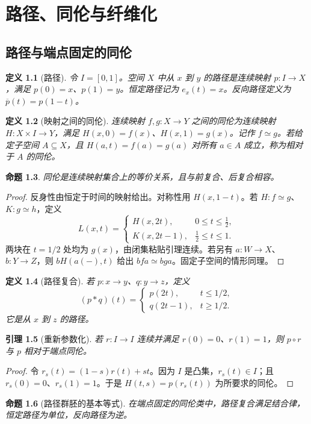 \documentclass[12pt,oneside,openany,fontset=none]{ctexbook}
\theoremstyle{cn}
\newtheorem{definition}{定义}[chapter]
\newtheorem{lemma}[definition]{引理}
\newtheorem{proposition}[definition]{命题}
\numberwithin{equation}{chapter}
\begin{document}
\chapter{路径、同伦与纤维化}
\section{路径与端点固定的同伦}
\begin{definition}[路径]
令 $I=[0,1]$。空间 $X$ 中从 $x$ 到 $y$ 的路径是连续映射 $p:I\to X$，满足 $p(0)=x$、$p(1)=y$。恒定路径记为 $e_x(t)=x$。反向路径定义为 $\overline p(t)=p(1-t)$。
\end{definition}
\begin{definition}[映射之间的同伦]
连续映射 $f,g:X\to Y$ 之间的同伦为连续映射 $H:X\times I\to Y$，满足 $H(x,0)=f(x)$、$H(x,1)=g(x)$。记作 $f\simeq g$。若给定子空间 $A\subseteq X$，且 $H(a,t)=f(a)=g(a)$ 对所有 $a\in A$ 成立，称为相对于 $A$ 的同伦。
\end{definition}
\begin{proposition}
同伦是连续映射集合上的等价关系，且与前复合、后复合相容。
\end{proposition}
\begin{proof}
反身性由恒定于时间的映射给出。对称性用 $H(x,1-t)$。若 $H:f\simeq g$、$K:g\simeq h$，定义
\[
L(x,t)=
\begin{cases}
H(x,2t),&0\le t\le\frac12,\\
K(x,2t-1),&\frac12\le t\le1.
\end{cases}
\]
两块在 $t=1/2$ 处均为 $g(x)$，由闭集粘贴引理连续。若另有 $a:W\to X$、$b:Y\to Z$，则 $bH(a(-),t)$ 给出 $bfa\simeq bga$。固定子空间的情形同理。
\end{proof}
\begin{definition}[路径复合]
若 $p:x\to y$、$q:y\to z$，定义
\[
(p*q)(t)=
\begin{cases}
p(2t),&t\le1/2,\\
q(2t-1),&t\ge1/2.
\end{cases}
\]
它是从 $x$ 到 $z$ 的路径。
\end{definition}
\begin{lemma}[重新参数化]
若 $r:I\to I$ 连续并满足 $r(0)=0$、$r(1)=1$，则 $p\circ r$ 与 $p$ 相对于端点同伦。
\end{lemma}
\begin{proof}
令 $r_s(t)=(1-s)r(t)+st$。因为 $I$ 是凸集，$r_s(t)\in I$；且 $r_s(0)=0$、$r_s(1)=1$。于是 $H(t,s)=p(r_s(t))$ 为所要求的同伦。
\end{proof}
\begin{proposition}[路径群胚的基本等式]
在端点固定的同伦类中，路径复合满足结合律，恒定路径为单位，反向路径为逆。
\end{proposition}
\end{document}
